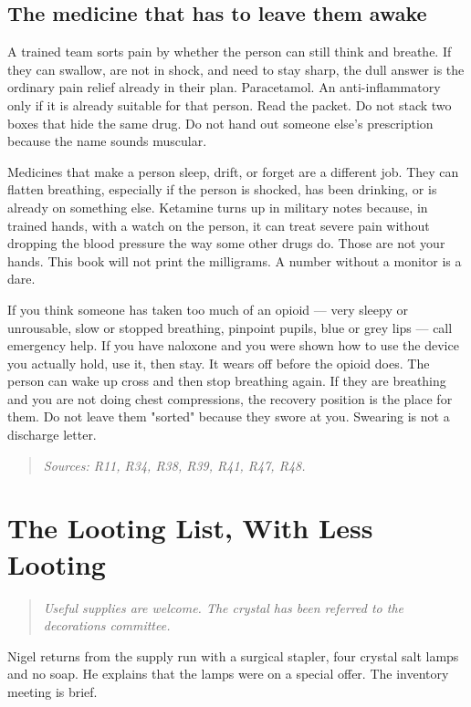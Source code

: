 \documentclass[10pt,openright]{book}
\begin{document}
\section*{The medicine that has to leave them awake}
A trained team sorts pain by whether the person can still think and breathe. If they can swallow, are not in shock, and need to stay sharp, the dull answer is the ordinary pain relief already in their plan. Paracetamol. An anti-inflammatory only if it is already suitable for that person. Read the packet. Do not stack two boxes that hide the same drug. Do not hand out someone else's prescription because the name sounds muscular.

Medicines that make a person sleep, drift, or forget are a different job. They can flatten breathing, especially if the person is shocked, has been drinking, or is already on something else. Ketamine turns up in military notes because, in trained hands, with a watch on the person, it can treat severe pain without dropping the blood pressure the way some other drugs do. Those are not your hands. This book will not print the milligrams. A number without a monitor is a dare.

If you think someone has taken too much of an opioid — very sleepy or unrousable, slow or stopped breathing, pinpoint pupils, blue or grey lips — call emergency help. If you have naloxone and you were shown how to use the device you actually hold, use it, then stay. It wears off before the opioid does. The person can wake up cross and then stop breathing again. If they are breathing and you are not doing chest compressions, the recovery position is the place for them. Do not leave them "sorted" because they swore at you. Swearing is not a discharge letter.

\begin{quote}\emph{Sources: R11, R34, R38, R39, R41, R47, R48.}\end{quote}

\chapter{The Looting List, With Less Looting}
\begin{quote}\emph{Useful supplies are welcome. The crystal has been referred to the decorations committee.}\end{quote}
Nigel returns from the supply run with a surgical stapler, four crystal salt lamps and no soap. He explains that the lamps were on a special offer. The inventory meeting is brief.
\end{document}
